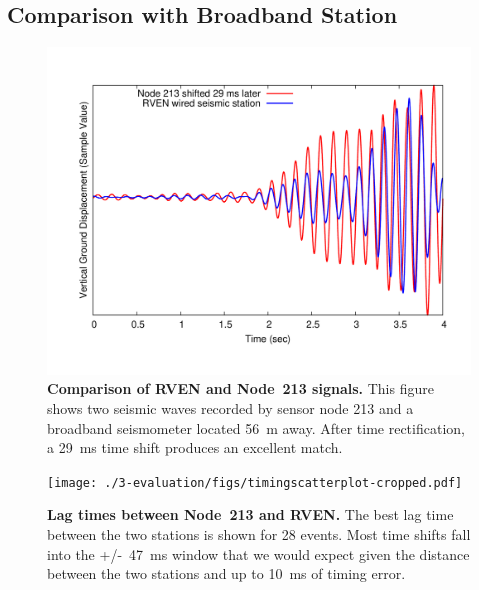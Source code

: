 \subsection{Comparison with Broadband Station}
\label{evaluation-sec-datagroundtruthing}

\begin{figure}[t]
\begin{center}
\includegraphics[width=\hsize]{./3-evaluation/figs/broadbandmatch.pdf}
\end{center}

\caption{\textbf{Comparison of RVEN and Node~213 signals.} This figure shows
two seismic waves recorded by sensor node 213 and a broadband seismometer
located 56~m away. After time rectification, a 29~ms time shift produces an
excellent match.}

\label{evaluation-fig-broadbandmatch}
\end{figure}

\begin{figure}[t]
\begin{center}
\texttt{[image: ./3-evaluation/figs/timingscatterplot-cropped.pdf]}
\end{center}

\caption{\textbf{Lag times between Node~213 and RVEN.} The best lag time
between the two stations is shown for 28 events. Most time shifts fall into
the +/-~47~ms window that we would expect given the distance between the two
stations and up to 10~ms of timing error.}

\label{evaluation-fig-timingscatterplot}
\end{figure}


